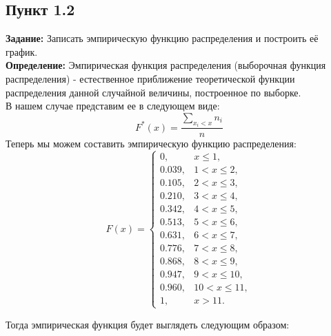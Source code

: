\documentclass[12pt]{article}
\begin{document}
\subsection*{Пункт 1.2}
\textbf{Задание:} Записать эмпирическую функцию распределения и построить её график.\\
\vspace{5mm}
\textbf{Определение:} Эмпирическая функция распределения (выборочная функция распределения) - естественное приближение теоретической функции распределения данной случайной величины, построенное по выборке.\\
\vspace{5mm}
В нашем случае представим ее в следующем виде:\\
$$ F^*(x) = \frac{\sum_{x_i<x}n_i}{n} $$
\newpage
Теперь мы можем составить эмпирическую функцию распределения:\\
\centering
\[
F(x) = 
\begin{cases} 
0, & x \leq 1, \\
0.039, & 1 < x \leq 2, \\
0.105, & 2 < x \leq 3, \\
0.210, & 3 < x \leq 4, \\
0.342, & 4 < x \leq 5, \\
0.513, & 5 < x \leq 6, \\
0.631, & 6 < x \leq 7, \\
0.776, & 7 < x \leq 8, \\
0.868, & 8 < x \leq 9, \\
0.947, & 9 < x \leq 10, \\
0.960, & 10 < x \leq 11, \\
1, & x > 11.
\end{cases}
\]
\vspace{5mm}
\raggedright
Тогда эмпирическая функция будет выглядеть следующим образом:\\
\vspace{5mm}
\\
\\
\raggedright
\newpage
\end{document}
